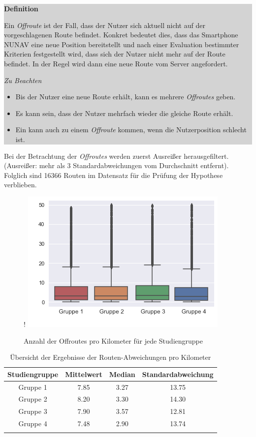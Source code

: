 \smallskip

\noindent\colorbox{lightgray}{%
    \parbox{0.975\linewidth}{
        \textbf{Definition}

        Ein \textit{Offroute} ist der Fall, dass der Nutzer sich aktuell nicht auf der vorgeschlagenen Route befindet. Konkret bedeutet dies, dass das Smartphone NUNAV eine neue Position bereitstellt und nach einer Evaluation bestimmter Kriterien festgestellt wird, dass sich der Nutzer nicht mehr auf der Route befindet. In der Regel wird dann eine neue Route vom Server angefordert.
        
        \textit{Zu Beachten}
        \begin{itemize}
            \item Bis der Nutzer eine neue Route erhält, kann es mehrere \textit{Offroutes} geben.
            \item Es kann sein, dass der Nutzer mehrfach wieder die gleiche Route erhält.
            \item Ein kann auch zu einem \textit{Offroute} kommen, wenn die Nutzerposition schlecht ist.
        \end{itemize}
    }
}

\smallskip

Bei der Betrachtung der \textit{Offroutes} werden zuerst Ausreißer herausgefiltert. (Ausreißer: mehr als 3 Standardabweichungen vom Durchschnitt entfernt). Folglich sind 16366 Routen im Datensatz für die Prüfung der Hypothese verblieben.

\begin{figure}[bth]!
    \includegraphics{contents/06_model_evaluation/res/OffRoute_Result_Overview.png}
    \caption{Anzahl der Offroutes pro Kilometer für jede Studiengruppe}
\end{figure}

\begin{longtable}{|c|c|c|c|}
    \hline
    \textbf{Studiengruppe}  & \textbf{Mittelwert} & \textbf{Median} & \textbf{Standardabweichung} \\ \hline
    Gruppe 1                & 7.85 & 3.27 & 13.75 \\ \hline
    Gruppe 2                & 8.20 & 3.30 & 14.30 \\ \hline
    Gruppe 3                & 7.90 & 3.57 & 12.81 \\ \hline
    Gruppe 4                & 7.48 & 2.90 & 13.74 \\ \hline
\caption{Übersicht der Ergebnisse der Routen-Abweichungen pro Kilometer}
\label{tab:study_offroute_results}
\end{longtable}

